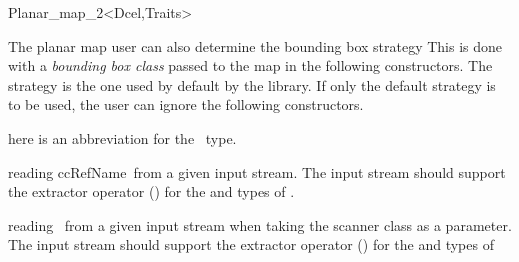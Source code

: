 \begin{ccRefClass}{Planar_map_2<Dcel,Traits>}
\begin{ccAdvanced}


The planar map user can also determine the bounding box strategy
This is done with a {\em bounding box class} passed to the map in the following constructors. 
The  strategy is the one used by default by the library. If only the default strategy is to be used, the user can ignore the following constructors.

  

 here is an abbreviation for the \ccRefName\ type.

\end{ccAdvanced}

\begin{ccAdvanced}

{reading ccRefName\ from a given input stream.
   The input stream should support the extractor operator (\ccc{>>}) for the  
   and  types of . } 

{reading \ccRefName\ from a given input stream when taking the scanner class as a parameter.
   The input stream should support the extractor operator (\ccc{>>}) for the  
   and  types of  }

\end{ccAdvanced}


\ccQueryFunctions


\end{ccRefClass}
